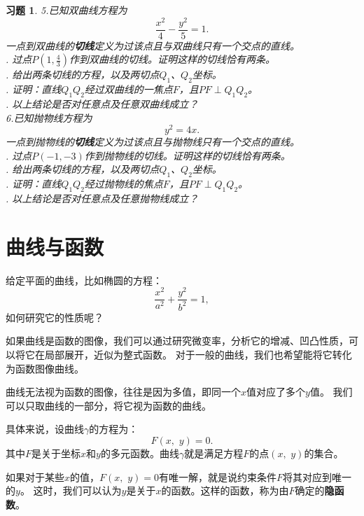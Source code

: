 \documentclass[12pt,UTF8]{ctexbook}
\theoremstyle{definition}
\theoremstyle{plain}
\newtheorem{xt}{习题}[section]
\begin{document}
\begin{xt}
    \indent 5.已知双曲线方程为
    $$ \frac{x^2}{4} - \frac{y^2}{5} = 1.$$ 
    一点到双曲线的\textbf{切线}定义为过该点且与双曲线只有一个交点的直线。\\
    . 过点$P\left(1, \frac{4}{3}\right)$作到双曲线的切线。证明这样的切线恰有两条。\\
    . 给出两条切线的方程，以及两切点$Q_1$、$Q_2$坐标。\\
    . 证明：直线$Q_1Q_2$经过双曲线的一焦点$F$，且$PF\perp Q_1Q_2$。\\
    . 以上结论是否对任意点及任意双曲线成立？\\
    \indent 6.已知抛物线方程为
    $$ y^2 = 4x.$$ 
    一点到抛物线的\textbf{切线}定义为过该点且与抛物线只有一个交点的直线。\\
    . 过点$P(-1, -3)$作到抛物线的切线。证明这样的切线恰有两条。\\
    . 给出两条切线的方程，以及两切点$Q_1$、$Q_2$坐标。\\
    . 证明：直线$Q_1Q_2$经过抛物线的焦点$F$，且$PF\perp Q_1Q_2$。\\
    . 以上结论是否对任意点及任意抛物线成立？\\
    
\end{xt}

\section{曲线与函数}

给定平面的曲线，比如椭圆的方程：
$$ \frac{x^2}{a^2} + \frac{y^2}{b^2} = 1,$$
如何研究它的性质呢？

如果曲线是函数的图像，我们可以通过研究微变率，分析它的增减、凹凸性质，可以将它在局部展开，近似为整式函数。
对于一般的曲线，我们也希望能将它转化为函数图像曲线。

曲线无法视为函数的图像，往往是因为多值，即同一个$x$值对应了多个$y$值。
我们可以只取曲线的一部分，将它视为函数的曲线。

具体来说，设曲线$\gamma$的方程为：
$$ F(x, \,\, y) = 0. $$
其中$F$是关于坐标$x$和$y$的多元函数。曲线$\gamma$就是满足方程$F$的点$(x,\,\,y)$的集合。

如果对于某些$x$的值，$F(x, \,\,y) = 0$有唯一解，就是说约束条件$F$将其对应到唯一的$y$。
这时，我们可以认为$y$是关于$x$的函数。这样的函数，称为由$F$确定的\textbf{隐函数}。
\end{document}
